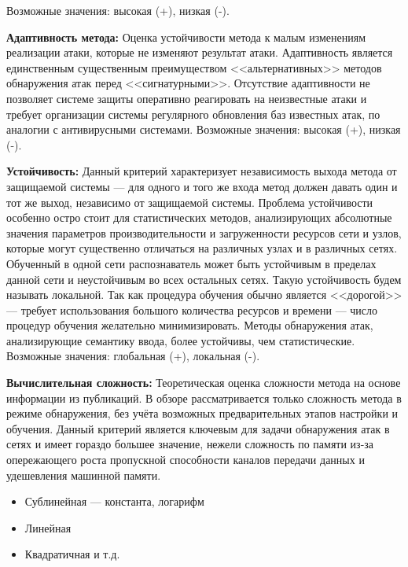 Возможные значения: высокая (+), низкая (-).

\textbf{Адаптивность метода:} Оценка устойчивости метода к малым изменениям реализации атаки, которые не изменяют результат атаки. Адаптивность является единственным существенным преимуществом <<альтернативных>> методов обнаружения атак перед <<сигнатурными>>. Отсутствие адаптивности не позволяет системе защиты оперативно реагировать на неизвестные атаки и требует организации системы регулярного обновления баз известных атак, по аналогии с антивирусными системами. Возможные значения: высокая (+), низкая (-).

\textbf{Устойчивость:} Данный критерий характеризует независимость выхода метода от защищаемой системы --- для одного и того же входа метод должен давать один и тот же выход, независимо от защищаемой системы. Проблема устойчивости особенно остро стоит для статистических методов, анализирующих абсолютные значения параметров производительности и загруженности ресурсов сети и узлов, которые могут существенно отличаться на различных узлах и в различных сетях. Обученный в одной сети распознаватель может быть устойчивым в пределах данной сети и неустойчивым во всех остальных сетях. Такую устойчивость будем называть локальной. Так как процедура обучения обычно является <<дорогой>> --- требует использования большого количества ресурсов и времени --- число процедур обучения желательно минимизировать. Методы обнаружения атак, анализирующие семантику ввода, более устойчивы, чем статистические. Возможные значения: глобальная (+), локальная (-).


\textbf{Вычислительная сложность:} Теоретическая оценка сложности метода на основе информации из публикаций. В обзоре рассматривается только сложность метода в режиме обнаружения, без учёта возможных предварительных этапов настройки и обучения. Данный критерий является ключевым для задачи обнаружения атак в сетях и имеет гораздо большее значение, нежели сложность по памяти из-за опережающего роста пропускной способности каналов передачи данных и удешевления машинной памяти.

\begin{itemize}

\item Сублинейная --- константа, логарифм

\item Линейная

\item Квадратичная и т.д.

\end{itemize}


